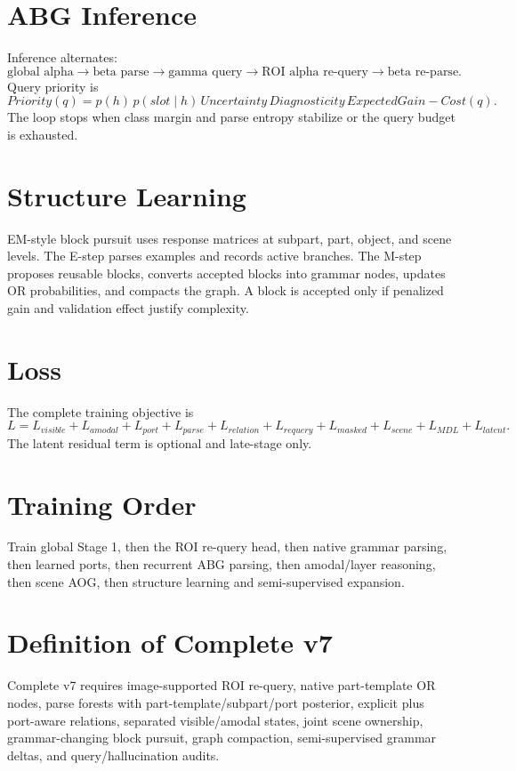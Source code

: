 \documentclass[11pt]{article}
\begin{document}
\section{ABG Inference}
Inference alternates:
\[
\text{global alpha}\rightarrow\text{beta parse}\rightarrow\text{gamma query}\rightarrow\text{ROI alpha re-query}\rightarrow\text{beta re-parse}.
\]
Query priority is
\[
Priority(q)=p(h)\,p(slot\mid h)\,Uncertainty\,Diagnosticity\,ExpectedGain-Cost(q).
\]
The loop stops when class margin and parse entropy stabilize or the query budget is exhausted.

\section{Structure Learning}
EM-style block pursuit uses response matrices at subpart, part, object, and scene levels.  The E-step parses examples and records active branches.  The M-step proposes reusable blocks, converts accepted blocks into grammar nodes, updates OR probabilities, and compacts the graph. A block is accepted only if penalized gain and validation effect justify complexity.

\section{Loss}
The complete training objective is
\[
L=L_{visible}+L_{amodal}+L_{port}+L_{parse}+L_{relation}+L_{requery}+L_{masked}+L_{scene}+L_{MDL}+L_{latent}.
\]
The latent residual term is optional and late-stage only.

\section{Training Order}
Train global Stage 1, then the ROI re-query head, then native grammar parsing, then learned ports, then recurrent ABG parsing, then amodal/layer reasoning, then scene AOG, then structure learning and semi-supervised expansion.

\section{Definition of Complete v7}
Complete v7 requires image-supported ROI re-query, native part-template OR nodes, parse forests with part-template/subpart/port posterior, explicit plus port-aware relations, separated visible/amodal states, joint scene ownership, grammar-changing block pursuit, graph compaction, semi-supervised grammar deltas, and query/hallucination audits.
\end{document}
